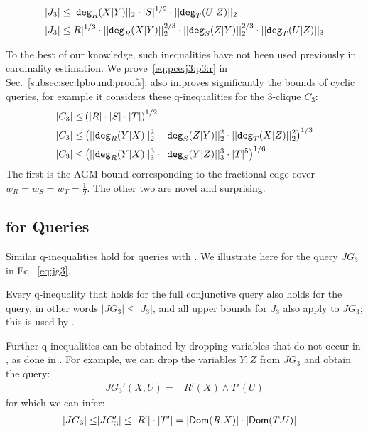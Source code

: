 {
\begin{align}
  |J_3| \leq & ||\texttt{deg}_R(X|Y)||_2 \cdot |S|^{1/2} \cdot||\texttt{deg}_T(U|Z)||_2 \nonumber\\
  |J_3| \leq & |R|^{1/3}\cdot ||\texttt{deg}_R(X|Y)||_2^{2/3} \cdot ||\texttt{deg}_S(Z|Y)||_{2}^{2/3}\cdot||\texttt{deg}_T(U|Z)||_3 \label{eq:pce:j3:p3:r}
\end{align}
}

To the best of our knowledge, such inequalities have not been used
previously in cardinality estimation.  We prove~\eqref{eq:pce:j3:p3:r}
in Sec.~\ref{subsec:sec:lpbound:proofs}.  \system also improves significantly the bounds of cyclic
queries, for example it considers these q-inequalities for the
3-clique $C_3$:
%
\begin{align}
  |C_3| \leq & \left(|R|\cdot |S| \cdot |T|\right)^{1/2}\nonumber \\
  |C_3| \leq & \left(||\texttt{deg}_R(Y|X)||_2^2\cdot||\texttt{deg}_S(Z|Y)||_2^2\cdot||\texttt{deg}_T(X|Z)||_2^2\right)^{1/3}\nonumber \\
  |C_3| \leq & \left(||\texttt{deg}_R(Y|X)||_3^3\cdot||\texttt{deg}_S(Y|Z)||_3^3\cdot|T|^5\right)^{1/6}\label{eq:pce:t:3} 
\end{align}
%
The first is the AGM bound corresponding to the fractional edge cover
$w_R=w_S=w_T=\frac{1}{2}$.  The other two are novel and surprising.

\subsection{\system for \groupby Queries}
\label{sec:lpbound-groupby-queries}

Similar q-inequalities hold for queries with \groupby.  We 
illustrate here for the query $JG_3$ in Eq.~\eqref{eq:jg3}.

Every q-inequality that holds for the full conjunctive query also
holds for the \groupby query, in other words $|JG_3|\leq |J_3|$, and
all upper bounds for $J_3$ also apply to $JG_3$; this is used by \duckdb.

Further q-inequalities can be obtained by dropping variables that do not occur in \groupby, as done in \psql.  For example, we can drop the variables $Y,Z$ from $JG_3$
and obtain the query:
%
\begin{align*}
  JG_3'(X,U) = & R'(X) \wedge T'(U)
\end{align*}
%
for which we can infer:
%
\begin{align*}
  |JG_3|\leq& |JG_3'| \leq |R'|\cdot|T'| = |\textsf{Dom}(R.X)|\cdot|\textsf{Dom}(T.U)|
\end{align*}
%

